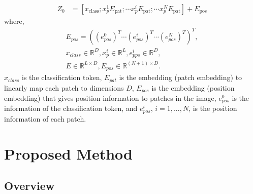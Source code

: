 \documentclass[conference, a4paper]{IEEEtran}
\begin{document}
\begin{align}
      Z_{0} &= [x_{\text{class}}; x_p^{1}E_{\text{pat}}; \cdots x_p^{i}E_{\text{pat}}; \cdots x_p^{N}E_{\text{pat}}] + E_{\text{pos}} 
\end{align}
where, 
\begin{align}
      E_{pos}= \left(  \left( e^{0}_{pos} \right)^T \cdots \left( e^{i}_{pos}  \right)^T  \cdots \left( e^{N}_{pos} \right)^T\right)^T, \nonumber \\  
      x_{class} \in{\mathbb{R}^{D}}, x_{p}^{i} \in{\mathbb{R}^{L}}, e_{pps}^{i} \in{\mathbb{R}^{D}},~~~~~~~~ \nonumber \\ 
      E \in{\mathbb{R}^{L \times D}}, E_{pos} \in{\mathbb{R}^{(N+1) \times D}}. ~~~~~~~~~~ \nonumber
\end{align}
$x_{class}$ is the classification token, $E_{pat}$ is the embedding (patch embedding) to linearly map each patch to dimensions $D$, $E_{pos}$ is the embedding (position embedding) that gives position information to patches in the image, $e^{0}_{pos}$ is the information of the classification token, and $e^{i}_{pos}$, $i=1,...,N$, is the position information of each patch.

\section{Proposed Method}
\subsection{Overview}
\end{document}
